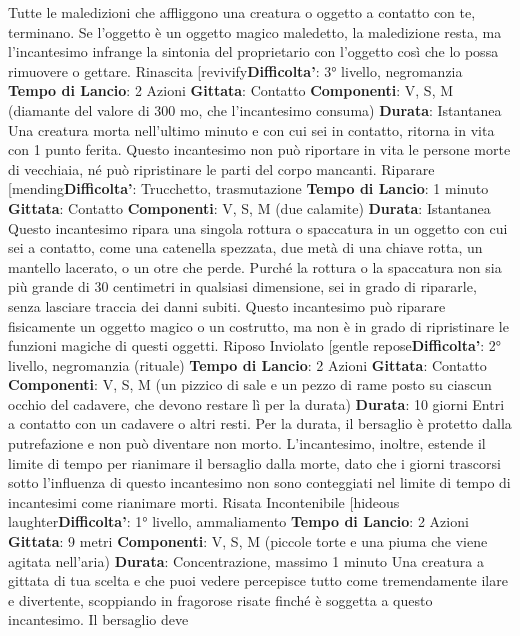 \begin{multicols}{2}
Tutte le maledizioni che affliggono una creatura o
oggetto a contatto con te, terminano. Se l’oggetto è un
oggetto magico maledetto, la maledizione resta, ma
l’incantesimo infrange la sintonia del proprietario con
l’oggetto così che lo possa rimuovere o gettare.
Rinascita
[revivify\textbf{Difficolta'}:
3° livello, negromanzia
\textbf{Tempo di Lancio}: 2 Azioni
\textbf{Gittata}: Contatto
\textbf{Componenti}: V, S, M (diamante del valore di 300 mo,
che l’incantesimo consuma)
\textbf{Durata}: Istantanea
Una creatura morta nell’ultimo minuto e con cui sei in
contatto, ritorna in vita con 1 punto ferita. Questo
incantesimo non può riportare in vita le persone morte
di vecchiaia, né può ripristinare le parti del corpo
mancanti.
Riparare
[mending\textbf{Difficolta'}:
Trucchetto, trasmutazione
\textbf{Tempo di Lancio}: 1 minuto
\textbf{Gittata}: Contatto
\textbf{Componenti}: V, S, M (due calamite)
\textbf{Durata}: Istantanea
Questo incantesimo ripara una singola rottura o
spaccatura in un oggetto con cui sei a contatto, come
una catenella spezzata, due metà di una chiave rotta,
un mantello lacerato, o un otre che perde. Purché la
rottura o la spaccatura non sia più grande di 30
centimetri in qualsiasi dimensione, sei in grado di
ripararle, senza lasciare traccia dei danni subiti.
Questo incantesimo può riparare fisicamente un
oggetto magico o un costrutto, ma non è in grado di
ripristinare le funzioni magiche di questi oggetti.
Riposo Inviolato
[gentle repose\textbf{Difficolta'}:
2° livello, negromanzia (rituale)
\textbf{Tempo di Lancio}: 2 Azioni
\textbf{Gittata}: Contatto
\textbf{Componenti}: V, S, M (un pizzico di sale e un pezzo di
rame posto su ciascun occhio del cadavere, che
devono restare lì per la durata)
\textbf{Durata}: 10 giorni
Entri a contatto con un cadavere o altri resti. Per la
durata, il bersaglio è protetto dalla putrefazione e non
può diventare non morto.
L’incantesimo, inoltre, estende il limite di tempo per
rianimare il bersaglio dalla morte, dato che i giorni
trascorsi sotto l’influenza di questo incantesimo non 
sono conteggiati nel limite di tempo di incantesimi come
rianimare morti.
Risata Incontenibile
[hideous laughter\textbf{Difficolta'}:
1° livello, ammaliamento
\textbf{Tempo di Lancio}: 2 Azioni
\textbf{Gittata}: 9 metri
\textbf{Componenti}: V, S, M (piccole torte e una piuma che
viene agitata nell’aria)
\textbf{Durata}: Concentrazione, massimo 1 minuto
Una creatura a gittata di tua scelta e che puoi vedere
percepisce tutto come tremendamente ilare e
divertente, scoppiando in fragorose risate finché è
soggetta a questo incantesimo. Il bersaglio deve

\end{multicols}
